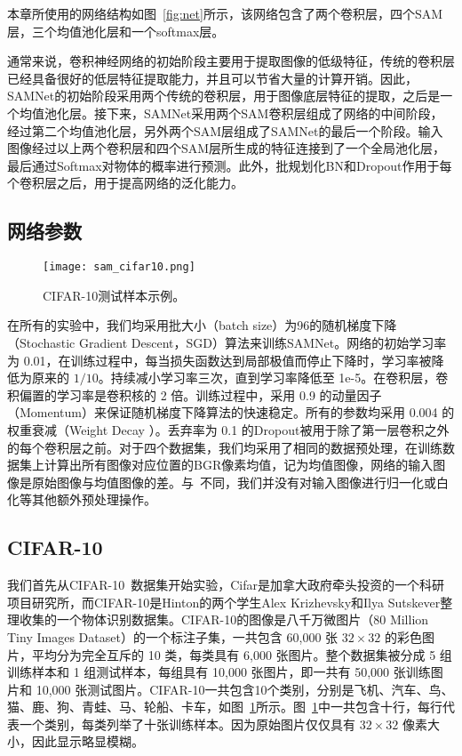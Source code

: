 本章所使用的网络结构如图~\ref{fig:net}所示，该网络包含了两个卷积层，四个SAM层，三个均值池化层和一个softmax层。

通常来说，卷积神经网络的初始阶段主要用于提取图像的低级特征，传统的卷积层已经具备很好的低层特征提取能力，并且可以节省大量的计算开销。因此，SAMNet的初始阶段采用两个传统的卷积层，用于图像底层特征的提取，之后是一个均值池化层。接下来，SAMNet采用两个SAM卷积层组成了网络的中间阶段，经过第二个均值池化层，另外两个SAM层组成了SAMNet的最后一个阶段。输入图像经过以上两个卷积层和四个SAM层所生成的特征连接到了一个全局池化层，最后通过Softmax对物体的概率进行预测。此外，批规划化BN和Dropout作用于每个卷积层之后，用于提高网络的泛化能力。

\subsection{网络参数}
\label{sec:sap:experiment:param}

\begin{figure}[!h]
\centering
\texttt{[image: sam\_cifar10.png]}
\caption{CIFAR-10测试样本示例。}
\label{fig:sam_cifar10}
\end{figure}


在所有的实验中，我们均采用批大小（batch size）为96的随机梯度下降（Stochastic Gradient Descent，SGD）算法来训练SAMNet。网络的初始学习率为 0.01，在训练过程中，每当损失函数达到局部极值而停止下降时，学习率被降低为原来的 $1/10$。持续减小学习率三次，直到学习率降低至 1e-5。在卷积层，卷积偏置的学习率是卷积核的 2 倍。训练过程中，采用 0.9 的动量因子（Momentum）来保证随机梯度下降算法的快速稳定。所有的参数均采用 0.004 的权重衰减（Weight Decay ）。丢弃率为 0.1 的Dropout被用于除了第一层卷积之外的每个卷积层之前。对于四个数据集，我们均采用了相同的数据预处理，在训练数据集上计算出所有图像对应位置的BGR像素均值，记为均值图像，网络的输入图像是原始图像与均值图像的差。与~\cite{goodfellow2013maxout}不同，我们并没有对输入图像进行归一化或白化等其他额外预处理操作。

\subsection{CIFAR-10}
\label{sec:sap:experiment:cifar10}

我们首先从CIFAR-10~\cite{krizhevsky2009learning}数据集开始实验，Cifar是加拿大政府牵头投资的一个科研项目研究所，而CIFAR-10是Hinton的两个学生Alex Krizhevsky和Ilya Sutskever整理收集的一个物体识别数据集。CIFAR-10的图像是八千万微图片（80 Million Tiny Images Dataset）的一个标注子集，一共包含 60,000 张 $32\times32$ 的彩色图片，平均分为完全互斥的 10 类，每类具有 6,000 张图片。整个数据集被分成 5 组训练样本和 1 组测试样本，每组具有 10,000 张图片，即一共有 50,000 张训练图片和 10,000 张测试图片。CIFAR-10一共包含10个类别，分别是飞机、汽车、鸟、猫、鹿、狗、青蛙、马、轮船、卡车，如图~\ref{fig:sam_cifar10}所示。图~\ref{fig:sam_cifar10}中一共包含十行，每行代表一个类别，每类列举了十张训练样本。因为原始图片仅仅具有 $32\times32$ 像素大小，因此显示略显模糊。

